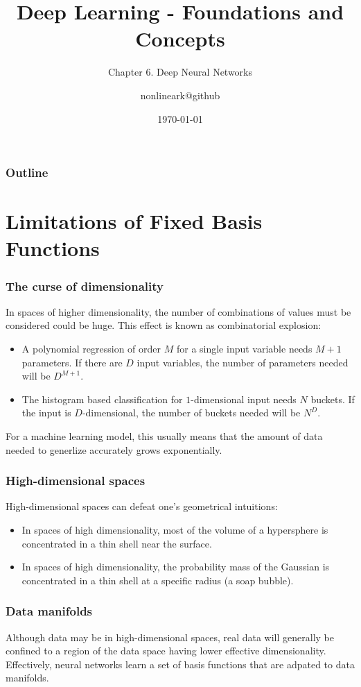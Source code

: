\documentclass{beamer}
\title{Deep Learning - Foundations and Concepts}
\subtitle{Chapter 6. Deep Neural Networks}
\author{nonlineark@github}
\date{\today}
\begin{document}
\begin{frame}
    \titlepage
\end{frame}

\begin{frame}
    \frametitle{Outline}
    \tableofcontents
\end{frame}

\section{Limitations of Fixed Basis Functions}

\begin{frame}
    \frametitle{The curse of dimensionality}
    In spaces of higher dimensionality, the number of combinations of values must be considered could be huge. This effect is known as combinatorial explosion:
    \begin{itemize}
        \item A polynomial regression of order $M$ for a single input variable needs $M+1$ parameters. If there are $D$ input variables, the number of parameters needed will be $D^{M+1}$.
        \item The histogram based classification for $1$-dimensional input needs $N$ buckets. If the input is $D$-dimensional, the number of buckets needed will be $N^{D}$.
    \end{itemize}
    For a machine learning model, this usually means that the amount of data needed to generlize accurately grows exponentially.
\end{frame}

\begin{frame}
    \frametitle{High-dimensional spaces}
    High-dimensional spaces can defeat one's geometrical intuitions:
    \begin{itemize}
        \item In spaces of high dimensionality, most of the volume of a hypersphere is concentrated in a thin shell near the surface.
        \item In spaces of high dimensionality, the probability mass of the Gaussian is concentrated in a thin shell at a specific radius (a soap bubble).
    \end{itemize}
\end{frame}

\begin{frame}
    \frametitle{Data manifolds}
    Although data may be in high-dimensional spaces, real data will generally be confined to a region of the data space having lower effective dimensionality. Effectively, neural networks learn a set of basis functions that are adpated to data manifolds.
\end{frame}
\end{document}
